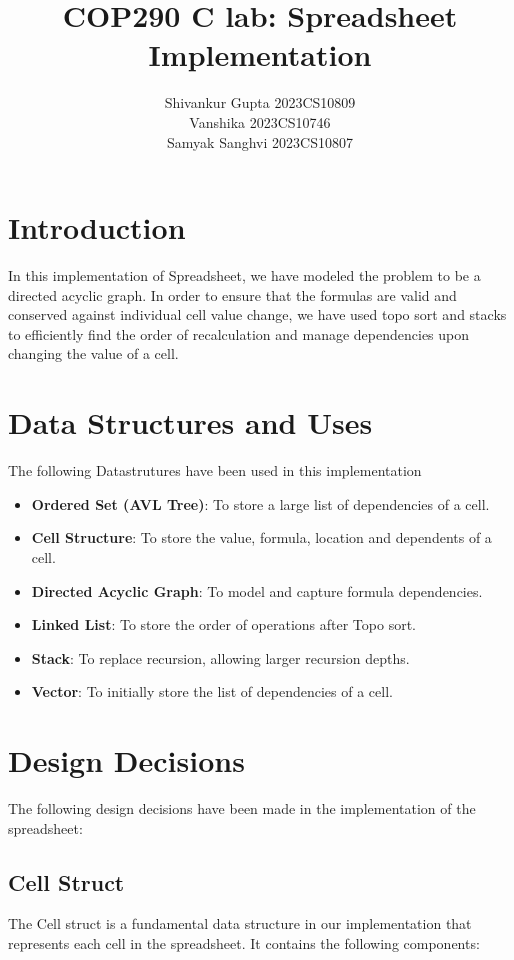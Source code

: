 \documentclass[10pt,a4paper]{article}  %
\title{COP290 C lab: Spreadsheet Implementation}
\author{Shivankur Gupta 2023CS10809\\ Vanshika 2023CS10746\\ Samyak Sanghvi 2023CS10807}
\begin{document}
\maketitle



\section{Introduction}
In this implementation of Spreadsheet, we have modeled the problem to be a directed acyclic graph. In order to ensure that the formulas are valid and conserved against individual cell value change, we have used topo sort and stacks to efficiently find the order of recalculation and manage dependencies upon changing the value of a cell.

\section{Data Structures and Uses}
The following Datastrutures have been used in this implementation

\begin{itemize}
    \item \textbf{Ordered Set (AVL Tree)}: To store a large list of dependencies of a cell.
    \item \textbf{Cell Structure}: To store the value, formula, location and dependents of a cell.
    \item \textbf{Directed Acyclic Graph}: To model and capture formula dependencies.
    \item \textbf{Linked List}: To store the order of operations after Topo sort.
    \item \textbf{Stack}: To replace recursion, allowing larger recursion depths.
    \item \textbf{Vector}: To initially store the list of dependencies of a cell.
\end{itemize}



\section{Design Decisions}
The following design decisions have been made in the implementation of the spreadsheet:
\subsection{Cell Struct}
The Cell struct is a fundamental data structure in our implementation that represents each cell in the spreadsheet. It contains the following components:
\end{document}
